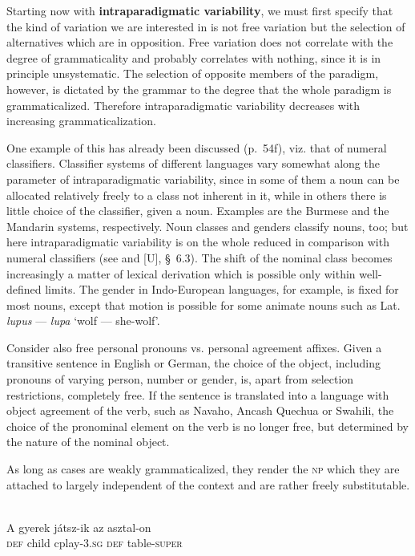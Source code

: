 Starting now with \textbf{intraparadigmatic variability}, we must first specify that the kind of variation we are interested in is not free variation but the selection of alternatives which are in opposition. Free variation does not correlate with the degree of grammaticality and probably correlates with nothing, since it is in principle unsystematic. The selection of opposite members of the paradigm, however, is dictated by the grammar to the degree that the whole paradigm is grammaticalized. Therefore intraparadigmatic variability decreases with increasing grammaticalization.

One example of this has already been discussed (p.~54f), viz. that of numeral classifiers. Classifier systems of different languages vary somewhat along the parameter of intraparadigmatic variability, since in some of them a noun can be allocated relatively freely to a class not inherent in it, while in others there is little choice of the classifier, given a noun. Examples are the Burmese and the Mandarin systems, respectively. Noun classes and genders classify nouns, too; but here intraparadigmatic variability is on the whole reduced in comparison with numeral classifiers (see \citet{Serzisko1981} and \citet{Lehmann1982}[U], §~6.3). The shift of the nominal class becomes increasingly a matter of lexical derivation which is possible only within well-defined limits. The gender in Indo-European languages, for example, is fixed for most nouns, except that motion is possible for some animate nouns such as Lat. \textit{lupus} — \textit{lupa} ‘wolf — she-wolf’.

Consider also free personal pronouns vs. personal agreement affixes. Given a transitive sentence in English or German, the choice of the object, including pronouns of varying person, number or gender, is, apart from selection restrictions, completely free. If the sentence is translated into a language with object agreement of the verb, such as Navaho, Ancash Quechua or Swahili, the choice of the pronominal element on the verb is no longer free, but determined by the nature of the nominal object.

As long as cases are weakly grammaticalized, they render the \textsc{np} which they are attached to largely independent of the context and are rather freely substitutable.

\ea\label{ex:}
\langinfo{\LangHung}{}{} \\
\gll     A  gyerek  játsz-ik  az  asztal-on\\
\textsc{def}  child  cplay-3.\textsc{sg}  \textsc{def}  table-\textsc{super}\\
\\
\z

